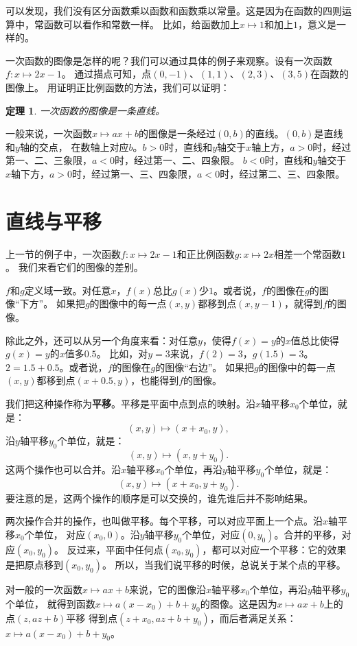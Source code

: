 \documentclass[12pt,UTF8]{ctexbook}
\newtheorem{tm}{定理}[section]
\begin{document}
可以发现，我们没有区分函数乘以函数和函数乘以常量。这是因为在函数的四则运算中，常函数可以看作和常数一样。
比如，给函数加上$x\mapsto 1$和加上$1$，意义是一样的。

一次函数的图像是怎样的呢？我们可以通过具体的例子来观察。设有一次函数$f: x\mapsto 2x - 1$。
通过描点可知，点$(0, -1)$、$(1, 1)$、$(2, 3)$、$(3, 5)$在函数的图像上。
用证明正比例函数的方法，我们可以证明：

\begin{tm}\label{tm:5-1-0}
    一次函数的图像是一条直线。
\end{tm}

一般来说，一次函数$x\mapsto ax + b$的图像是一条经过$(0, b)$的直线。$(0, b)$是直线和$y$轴的交点，
在数轴上对应$b$。$b>0$时，直线和$y$轴交于$x$轴上方，$a>0$时，经过第一、二、三象限，$a<0$时，经过第一、二、四象限。
$b<0$时，直线和$y$轴交于$x$轴下方，$a>0$时，经过第一、三、四象限，$a<0$时，经过第二、三、四象限。

\section{直线与平移}
上一节的例子中，一次函数$f: x\mapsto 2x - 1$和正比例函数$g: x\mapsto 2x$相差一个常函数$1$。
我们来看它们的图像的差别。

$f$和$g$定义域一致。对任意$x$，$f(x)$总比$g(x)$少$1$。或者说，$f$的图像在$g$的图像“下方”。
如果把$g$的图像中的每一点$(x, y)$都移到点$(x, y-1)$，就得到$f$的图像。

除此之外，还可以从另一个角度来看：对任意$y$，使得$f(x)=y$的$x$值总比使得$g(x)=y$的$x$值多$0.5$。
比如，对$y=3$来说，$f(2)=3$，$g(1.5)=3$。$2=1.5+0.5$。或者说，$f$的图像在$g$的图像“右边”。
如果把$g$的图像中的每一点$(x, y)$都移到点$(x+0.5, y)$，也能得到$f$的图像。

我们把这种操作称为\textbf{平移}。平移是平面中点到点的映射。沿$x$轴平移$x_0$个单位，就是：
$$ (x, y) \mapsto (x+x_0, y),$$
沿$y$轴平移$y_0$个单位，就是：
$$ (x, y) \mapsto (x, y+y_0).$$
这两个操作也可以合并。沿$x$轴平移$x_0$个单位，再沿$y$轴平移$y_0$个单位，就是：
$$ (x, y) \mapsto (x+x_0, y+y_0).$$
要注意的是，这两个操作的顺序是可以交换的，谁先谁后并不影响结果。

两次操作合并的操作，也叫做平移。每个平移，可以对应平面上一个点。沿$x$轴平移$x_0$个单位，
对应$(x_0, 0)$。沿$y$轴平移$y_0$个单位，对应$(0, y_0)$。合并的平移，对应$(x_0, y_0)$。
反过来，平面中任何点$(x_0, y_0)$，都可以对应一个平移：它的效果是把原点移到$(x_0, y_0)$。
所以，当我们说平移的时候，总说关于某个点的平移。

对一般的一次函数$x\mapsto ax+b$来说，它的图像沿$x$轴平移$x_0$个单位，再沿$y$轴平移$y_0$个单位，
就得到函数$x\mapsto a(x-x_0)+b+y_0$的图像。这是因为$x\mapsto ax+b$上的点$(z, az+b)$平移
得到点$(z+x_0, az+b+y_0)$，而后者满足关系：$x\mapsto a(x-x_0)+b+y_0$。
\end{document}

